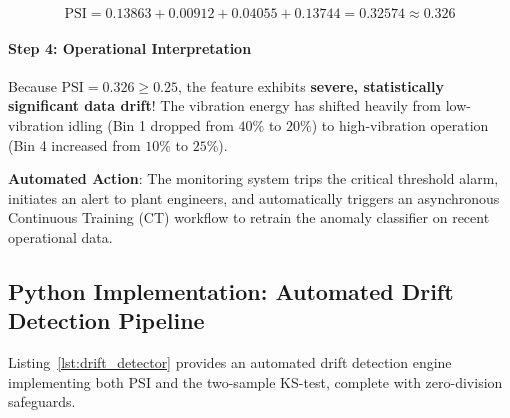 \begin{example}
\begin{equation*}
\text{PSI} = 0.13863 + 0.00912 + 0.04055 + 0.13744 = \mathbf{0.32574} \approx \mathbf{0.326}
\end{equation*}

\paragraph{Step 4: Operational Interpretation}
Because $\text{PSI} = 0.326 \ge 0.25$, the feature exhibits \textbf{severe, statistically significant data drift}! The vibration energy has shifted heavily from low-vibration idling (Bin 1 dropped from $40\%$ to $20\%$) to high-vibration operation (Bin 4 increased from $10\%$ to $25\%$). 

\textbf{Automated Action}: The monitoring system trips the critical threshold alarm, initiates an alert to plant engineers, and automatically triggers an asynchronous Continuous Training (CT) workflow to retrain the anomaly classifier on recent operational data.
\end{example}

\subsection{Python Implementation: Automated Drift Detection Pipeline}\label{subsec:drift_code}

Listing~\ref{lst:drift_detector} provides an automated drift detection engine implementing both PSI and the two-sample KS-test, complete with zero-division safeguards.


